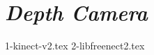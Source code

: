 \section{\emph{Depth Camera}}
\label{sec:depthcamera}

\textcolor{red}{\lipsum[1-2]}

{1-kinect-v2.tex}
{2-libfreenect2.tex}

